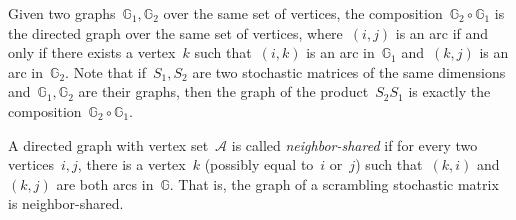 \documentclass[letterpaper, 10 pt, conference]{ieeeconf}  %
\begin{document}
Given two graphs~$\mathbb{G}_1, \mathbb{G}_2$ over the same set of vertices, the composition~$\mathbb{G}_2 \circ \mathbb{G}_1$ is the directed graph over the same set of vertices, where~$(i,j)$ is an arc if and only if there exists a vertex~$k$ such that~$(i,k)$ is an arc in~$\mathbb{G}_1$ and~$(k,j)$ is an arc in~$\mathbb{G}_2$. Note that if~$S_1,S_2$ are two stochastic matrices of the same dimensions and~$\mathbb{G}_1, \mathbb{G}_2$ are their graphs, then the graph of the product~$S_2 S_1$ is exactly the composition~$\mathbb{G}_2 \circ \mathbb{G}_1$.

A directed graph with vertex set~$\mathcal{A}$ is called \emph{neighbor-shared} if for every two vertices~$i,j$, there is a vertex~$k$ (possibly equal to~$i$ or~$j$) such that~$(k,i)$ and~$(k,j)$ are both arcs in~$\mathbb{G}$. That is, the graph of a scrambling stochastic matrix is neighbor-shared.
\end{document}
